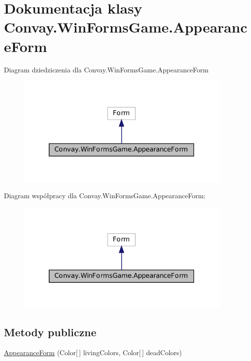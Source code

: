 \hypertarget{class_convay_1_1_win_forms_game_1_1_appearance_form}{}\section{Dokumentacja klasy Convay.\+Win\+Forms\+Game.\+Appearance\+Form}
\label{class_convay_1_1_win_forms_game_1_1_appearance_form}


Diagram dziedziczenia dla Convay.\+Win\+Forms\+Game.\+Appearance\+Form
\nopagebreak
\begin{figure}[H]
\begin{center}
\leavevmode
\includegraphics[width=303pt]{class_convay_1_1_win_forms_game_1_1_appearance_form__inherit__graph}
\end{center}
\end{figure}


Diagram współpracy dla Convay.\+Win\+Forms\+Game.\+Appearance\+Form\+:
\nopagebreak
\begin{figure}[H]
\begin{center}
\leavevmode
\includegraphics[width=303pt]{class_convay_1_1_win_forms_game_1_1_appearance_form__coll__graph}
\end{center}
\end{figure}
\subsection*{Metody publiczne}
\begin{DoxyCompactItemize}
\item 
\hyperlink{class_convay_1_1_win_forms_game_1_1_appearance_form_abf49c9dae804d8f082b71c1b37d0a5cd}{Appearance\+Form} (Color\mbox{[}$\,$\mbox{]} living\+Colors, Color\mbox{[}$\,$\mbox{]} dead\+Colors)
\end{DoxyCompactItemize}
